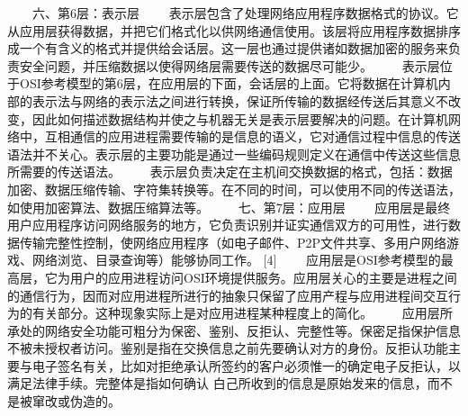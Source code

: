 　　六、第6层：表示层
　　表示层包含了处理网络应用程序数据格式的协议。它从应用层获得数据，并把它们格式化以供网络通信使用。该层将应用程序数据排序成一个有含义的格式并提供给会话层。这一层也通过提供诸如数据加密的服务来负责安全问题，并压缩数据以使得网络层需要传送的数据尽可能少。
　　表示层位于OSI参考模型的第6层，在应用层的下面，会话层的上面。它将数据在计算机内部的表示法与网络的表示法之间进行转换，保证所传输的数据经传送后其意义不改变，因此如何描述数据结构并使之与机器无关是表示层要解决的问题。在计算机网络中，互相通信的应用进程需要传输的是信息的语义，它对通信过程中信息的传送语法并不关心。表示层的主要功能是通过一些编码规则定义在通信中传送这些信息所需要的传送语法。
　　表示层负责决定在主机间交换数据的格式，包括：数据加密、数据压缩传输、字符集转换等。在不同的时间，可以使用不同的传送语法，如使用加密算法、数据压缩算法等。
　　七、第7层：应用层
　　应用层是最终用户应用程序访问网络服务的地方，它负责识别并证实通信双方的可用性，进行数据传输完整性控制，使网络应用程序（如电子邮件、P2P文件共享、多用户网络游戏、网络浏览、目录查询等）能够协同工作。  [4]
　　应用层是OSI参考模型的最高层，它为用户的应用进程访问OSI环境提供服务。应用层关心的主要是进程之间的通信行为，因而对应用进程所进行的抽象只保留了应用产程与应用进程间交互行为的有关部分。这种现象实际上是对应用进程某种程度上的简化。
　　应用层所承处的网络安全功能可粗分为保密、鉴别、反拒认、完整性等。保密足指保护信息不被未授权者访问。鉴别是指在交换信息之前先要确认对方的身份。反拒认功能主要与电子签名有关，比如对拒绝承认所签约的客户必须惟一的确定电子反拒认，以满足法律手续。完整体是指如何确认
白己所收到的信息是原始发来的信息，而不是被窜改或伪造的。

